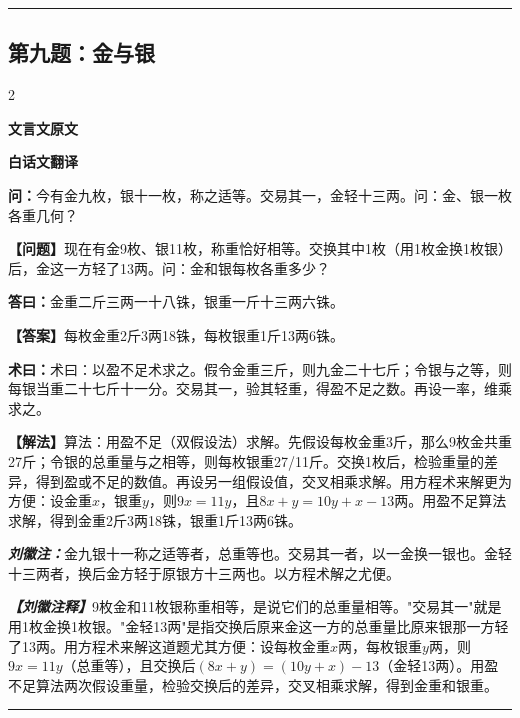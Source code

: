 \documentclass[10pt,a4paper]{article}
\newcommand{\wen}[1]{\textbf{\color{problemcolor}问：}#1\par}
\newcommand{\da}[1]{\textbf{答曰：}#1\par}
\newcommand{\shu}[1]{\textbf{术曰：}#1\par}
\newcommand{\liuhui}[1]{{\color{commentarycolor}\textit{\textbf{刘徽注：}}#1\par}}
\newcommand{\classicalheader}[1]{{\centering\large\bfseries\color{classicalcolor} #1\par\vspace{0.5em}}}
\newcommand{\wenmodern}[1]{\textbf{\color{moderncolor}【问题】}#1\par}
\newcommand{\damodern}[1]{\textbf{【答案】}#1\par}
\newcommand{\shumodern}[1]{\textbf{【解法】}#1\par}
\newcommand{\liuhuimodern}[1]{{\color{commentarycolor}\textit{\textbf{【刘徽注释】}}#1\par}}
\newcommand{\modernheader}[1]{{\centering\large\bfseries\color{moderncolor} #1\par\vspace{0.5em}}}
\newcommand{\problemsec}[1]{\subsection*{#1}}
\begin{document}
\vspace{0.3cm}
\hrule
\vspace{0.3cm}

\problemsec{第九题：金与银}
\begin{paracol}{2}
\classicalheader{文言文原文}
\switchcolumn
\modernheader{白话文翻译}
\switchcolumn*

\wen{今有金九枚，银十一枚，称之适等。交易其一，金轻十三两。问：金、银一枚各重几何？}

\switchcolumn

\wenmodern{现在有金9枚、银11枚，称重恰好相等。交换其中1枚（用1枚金换1枚银）后，金这一方轻了13两。问：金和银每枚各重多少？}

\switchcolumn*

\da{金重二斤三两一十八铢，银重一斤十三两六铢。}

\switchcolumn

\damodern{每枚金重2斤3两18铢，每枚银重1斤13两6铢。}

\switchcolumn*

\shu{术曰：以盈不足术求之。假令金重三斤，则九金二十七斤；令银与之等，则每银当重二十七斤十一分。交易其一，验其轻重，得盈不足之数。再设一率，维乘求之。}

\switchcolumn

\shumodern{算法：用盈不足（双假设法）求解。先假设每枚金重3斤，那么9枚金共重27斤；令银的总重量与之相等，则每枚银重27/11斤。交换1枚后，检验重量的差异，得到盈或不足的数值。再设另一组假设值，交叉相乘求解。用方程术来解更为方便：设金重$x$，银重$y$，则$9x=11y$，且$8x+y=10y+x-13$两。用盈不足算法求解，得到金重2斤3两18铢，银重1斤13两6铢。}

\switchcolumn*

\liuhui{金九银十一称之适等者，总重等也。交易其一者，以一金换一银也。金轻十三两者，换后金方轻于原银方十三两也。以方程术解之尤便。}

\switchcolumn

\liuhuimodern{9枚金和11枚银称重相等，是说它们的总重量相等。"交易其一"就是用1枚金换1枚银。"金轻13两"是指交换后原来金这一方的总重量比原来银那一方轻了13两。用方程术来解这道题尤其方便：设每枚金重$x$两，每枚银重$y$两，则$9x=11y$（总重等），且交换后$(8x+y)=(10y+x)-13$（金轻13两）。用盈不足算法两次假设重量，检验交换后的差异，交叉相乘求解，得到金重和银重。}

\end{paracol}

\vspace{0.3cm}
\hrule
\vspace{0.3cm}
\end{document}
